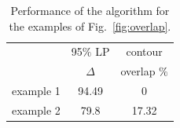 \begin{table}
\caption{Performance of the algorithm for the examples of Fig.~\ref{fig:overlap}.
}
\vspace{0mm}
\begin{tabular}{ccc}
\hline
          	& 95$\%$ LP &	contour				\\
          	& $\Delta$	& overlap $\%$	\\\hline
 example 1	&	94.49			&	0							\\\hline 
 example 2	&	79.8			& 17.32					\\\hline        

\end{tabular}
\label{tab:overlap}\vspace{-5mm}
\end{table}


